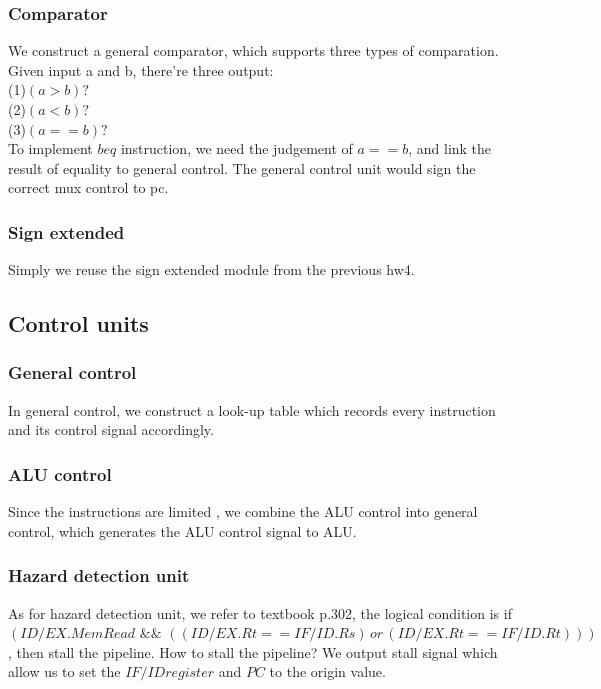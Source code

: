 \documentclass[11pt, a4paper]{article}
\begin{document}
\subsubsection{Comparator}
We construct a general comparator, which supports three types of comparation.\\
Given input a and b, there're three output:\\
(1)$(a>b)?$\\
(2)$(a<b)?$\\
(3)$(a==b)?$\\
To implement $beq$ instruction, we need the judgement of $a==b$, and link the result of equality to general control. The general control unit would sign the correct mux control to pc. 

\subsubsection{Sign extended}
Simply we reuse the sign extended module from the previous hw4.


\subsection{Control units}
\subsubsection{General control}
In general control, we construct a look-up table which records every instruction and its control signal accordingly.

\subsubsection{ALU control}
Since the instructions are limited , we combine the ALU control into general control, which generates the ALU control signal to ALU.

\subsubsection{Hazard detection unit}
As for hazard detection unit, we refer to textbook p.302, the logical condition is 
if
$
 (ID/EX.MemRead \,\,\&\&\,\, ((ID/EX.Rt == IF/ID.Rs)\,
 or \,(ID/EX.Rt == IF/ID.Rt))) 
$
, then stall the pipeline. How to stall the pipeline? We output stall signal which allow us to set the $IF/ID register$ and $PC$ to the origin value.
\end{document}
